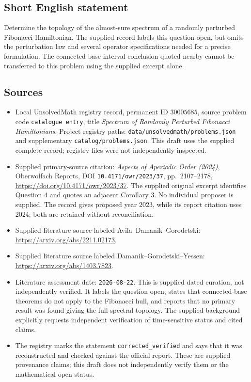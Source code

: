 \documentclass[11pt]{article}
\begin{document}
\subsection{Short English statement}
Determine the topology of the almost-sure spectrum of a randomly perturbed Fibonacci Hamiltonian. The supplied record labels this question open, but omits the perturbation law and several operator specifications needed for a precise formulation. The connected-base interval conclusion quoted nearby cannot be transferred to this problem using the supplied excerpt alone.
\subsection{Sources}
\begin{itemize}
\item Local UnsolvedMath registry record, permanent ID \(30005685\), source problem code \texttt{catalogue entry}, title \emph{Spectrum of Randomly Perturbed Fibonacci Hamiltonians}. Project registry paths: \texttt{data/unsolvedmath/problems.json} and supplementary \texttt{catalog/problems.json}. This draft uses the supplied complete record; registry files were not independently inspected.
\item Supplied primary-source citation: \emph{Aspects of Aperiodic Order (2024)}, Oberwolfach Reports, DOI \texttt{10.4171/owr/2023/37}, pp.\ 2107--2178, \url{https://doi.org/10.4171/owr/2023/37}. The supplied original excerpt identifies Question 4 and quotes an adjacent Corollary 3. No individual proposer is supplied. The record gives proposed year 2023, while its report citation uses 2024; both are retained without reconciliation.
\item Supplied literature source labeled Avila--Damanik--Gorodetski: \url{https://arxiv.org/abs/2211.02173}.
\item Supplied literature source labeled Damanik--Gorodetski--Yessen: \url{https://arxiv.org/abs/1403.7823}.
\item Literature assessment date: \texttt{2026-08-22}. This is supplied dated curation, not independently verified. It labels the question open, states that connected-base theorems do not apply to the Fibonacci hull, and reports that no primary result was found giving the full spectral topology. The supplied background explicitly requests independent verification of time-sensitive status and cited claims.
\item The registry marks the statement \texttt{corrected\_verified} and says that it was reconstructed and checked against the official report. These are supplied provenance claims; this draft does not independently verify them or the mathematical open status.
\end{itemize}
\end{document}
